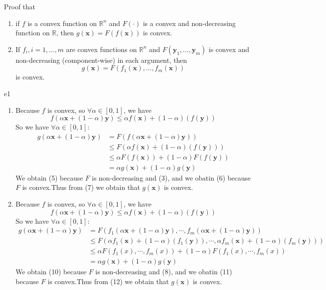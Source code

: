 \documentclass{article}
\newcommand{\xB}{\bm{x}}
\newcommand{\yB}{\bm{y}}
\newcommand{\RBB}{\mathbb{R}}
\begin{document}
\begin{excercise}\label{e1}
Proof that 
\begin{enumerate}
%
\item  if $f$ is a convex function on $\RBB^n$ and  $F(\cdot)$ is a convex and non-decreasing function on $\RBB$, then $g(\xB) = F(f(\xB))$ is convex.
%
\item If $f_i, i=1,\ldots, m$ are convex functions on $\RBB^n$ and  $F(\yB_1, \ldots, \yB_m)$ is convex and non-decreasing (component-wise) in each argument, then 
\[
g(\xB) = F(f_1(\xB), \ldots, f_m(\xB))
\]
is convex.
\end{enumerate}
\end{excercise}
\begin{PROOF}{e1}

	\begin{enumerate}
		\item Because $f$ is convex, so $\forall \alpha \in [0,1]$, we have
		\begin{equation}
			f(\alpha \xB+(1-\alpha) \yB)\le \alpha f(\xB)+(1-\alpha)(f(\yB))
		\end{equation}
		So we have $\forall \alpha \in [0,1]$:
			\begin{align}
				g(\alpha \xB+(1-\alpha) \yB)&=F(f(\alpha \xB+(1-\alpha) \yB))\\
				&\le F(\alpha f(\xB)+(1-\alpha)(f(\yB)))\\ 
				&\le \alpha F(f(\xB))+(1-\alpha)F(f(\yB))\\ 
				&=\alpha g(\xB)+(1-\alpha)g(\yB)
			\end{align}
		We obtain (5) because $F$ is non-decreasing and (3), and we obatin (6) because $F$ is convex.Thus from (7) we obtain that $g(\xB)$ is convex.
		\item Because $f$ is convex, so $\forall \alpha \in [0,1]$, we have
		\begin{equation}
			f(\alpha \xB+(1-\alpha) \yB)\le \alpha f(\xB)+(1-\alpha)(f(\yB))
		\end{equation}
		So we have $\forall \alpha \in [0,1]$:
		\begin{align}
			g(\alpha \xB+(1-\alpha) \yB)&=F(f_1(\alpha \xB+(1-\alpha) \yB),\cdots,f_m(\alpha \xB+(1-\alpha) \yB))\\
			&\le F(\alpha f_1(\xB)+(1-\alpha)(f_1(\yB)),\cdots,\alpha f_m(\xB)+(1-\alpha)(f_m(\yB)))\\
			&\le \alpha F(f_1(x),\cdots,f_m(x))+(1-\alpha)F(f_1(x),\cdots,f_m(x))\\
			&=\alpha g(\xB)+(1-\alpha)g(\yB)
		\end{align}
		We obtain (10) because $F$ is non-decreasing and (8), and we obatin (11) because $F$ is convex.Thus from (12) we obtain that $g(\xB)$ is convex.
	\end{enumerate}
\end{PROOF}
\end{document}
